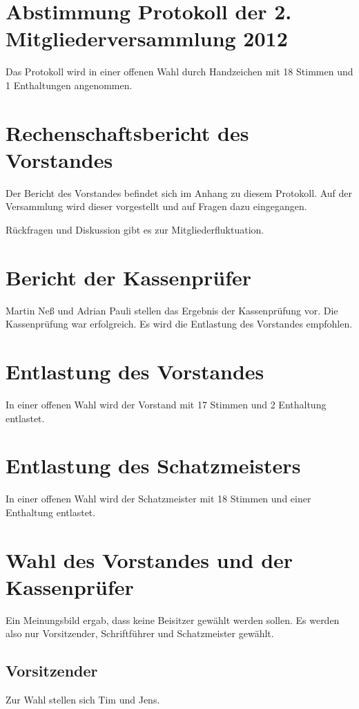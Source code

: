 \documentclass{scrartcl}
\begin{document}
\section{Abstimmung Protokoll der 2. Mitgliederversammlung 2012}
Das Protokoll wird in einer offenen Wahl durch Handzeichen mit 18 Stimmen
und 1 Enthaltungen angenommen.

\section{Rechenschaftsbericht des Vorstandes}
Der Bericht des Vorstandes befindet sich im Anhang zu diesem Protokoll.
Auf der Versammlung wird dieser vorgestellt und auf Fragen dazu
eingegangen.

Rückfragen und Diskussion gibt es zur Mitgliederfluktuation.

\section{Bericht der Kassenprüfer}
Martin Neß und Adrian Pauli stellen das Ergebnis der Kassenprüfung vor.
Die Kassenprüfung war erfolgreich. Es wird die Entlastung des Vorstandes empfohlen.


\section{Entlastung des Vorstandes} %
In einer offenen Wahl wird der Vorstand mit 17 Stimmen und 2
Enthaltung entlastet.

\section{Entlastung des Schatzmeisters}
In einer offenen Wahl wird der Schatzmeister mit 18 Stimmen und einer
Enthaltung entlastet.

\section{Wahl des Vorstandes und der Kassenprüfer}
Ein Meinungsbild ergab, dass keine Beisitzer gewählt werden sollen. Es
werden also nur Vorsitzender, Schriftführer und Schatzmeister gewählt.

\subsection{Vorsitzender}
Zur Wahl stellen sich Tim und Jens. %
\end{document}
